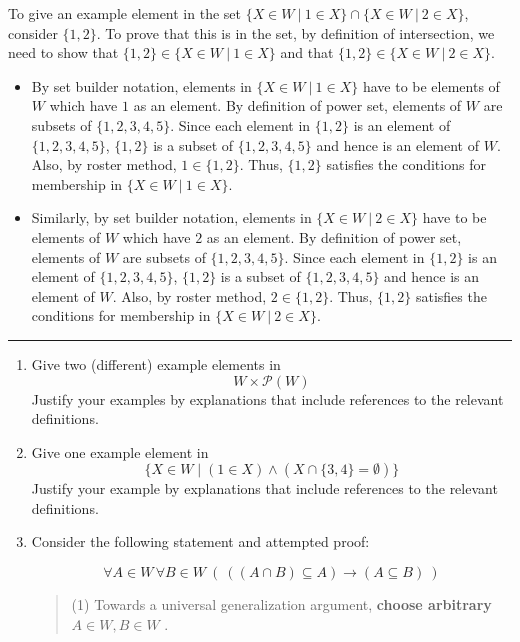 \begin{enumerate}[labelindent=0pt, leftmargin=0pt]
    To give an example element in the set 
    $\{ X \in W ~|~ 1 \in X \} \cap \{ X \in W ~|~  2 \in X \}$,
    consider $\{ 1,2\}$. To prove that this is in the set, by definition of intersection, we need to show
    that $\{1,2\} \in \{ X \in W ~|~ 1 \in X \}$ and that $\{1,2\} \in \{ X \in W ~|~ 2 \in X \}$.
    \begin{itemize}
    \item By set builder notation, elements in $\{ X \in W ~|~ 1 \in X \}$ have to be elements of $W$ which have $1$ as an element. By definition of power set, elements of $W$ are subsets of $\{1,2,3,4,5\}$. Since
    each element in $\{1,2\}$ is an element of $\{1,2,3,4,5\}$, $\{1,2\}$ is a subset of $\{1,2,3,4,5\}$ 
    and hence is an element of $W$. Also, by roster method, $1 \in \{1,2\}$. Thus, $\{1,2\}$ satisfies the 
    conditions for membership in $\{ X \in W ~|~ 1 \in X \}$.
    \item Similarly, by set builder notation, elements in $\{ X \in W ~|~ 2 \in X \}$ have to be elements of $W$ 
    which have $2$ as an element. 
    By definition of power set, elements of $W$ are subsets of $\{1,2,3,4,5\}$. Since
    each element in $\{1,2\}$ is an element of $\{1,2,3,4,5\}$, $\{1,2\}$ is a subset of $\{1,2,3,4,5\}$ 
    and hence is an element of $W$. Also, by roster method, $2 \in \{1,2\}$. Thus, $\{1,2\}$ satisfies the 
    conditions for membership in $\{ X \in W ~|~ 2 \in X \}$.
    \end{itemize}
    
    \rule{0.5\textwidth}{.4pt}
    
    
    \begin{enumerate}
    \item Give two (different) example elements in 
    \[
    W \times \mathcal{P}(W)
    \]
    Justify your examples by explanations that include references to the relevant definitions.
    
    \item Give one example element in 
    \[
    \{ X \in W \mid (1 \in X) \land (X \cap \{3,4\} = \emptyset) \}
    \]
    Justify your example by explanations that include references to the relevant definitions.
    
    \item Consider the following statement and attempted proof:
    
    
    $$\forall A \in W \, \forall B \in W ~\left(~((A \cap B) \subseteq A) \to (A \subseteq B)~\right)$$
    
    \begin{quote}
    (1) Towards a universal generalization argument, {\bf choose arbitrary} $A \in W, B \in W$ .
    

\end{quote}
\end{enumerate}
\end{enumerate}
